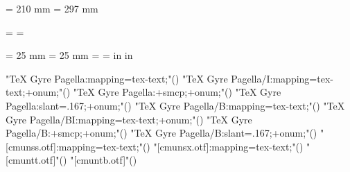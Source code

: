

\xeCJK@numtrue
\relax
\relax
{}
\makeatletter
\newdimen\paperwidth
\newdimen\paperheight
\paperwidth  = 210 mm
\paperheight = 297 mm

\begingroup
\edef\tempa{\meaning\pdfpagewidth}
\edef\tempb{\string\pdfpagewidth}
\ifx\tempa\tempb
  \endgroup
  \pdfpagewidth  = \paperwidth
  \pdfpageheight = \paperheight
\else
  \endgroup
\fi

\hoffset = 25 mm
\voffset = 25 mm
\hsize = \paperwidth
\vsize = \paperheight
\advance {}\hoffset
\advance {}\voffset
\advance {} in
\advance {} in

\def\getzihaosize#1{%
  \ifnum#11>0 %
    \ifcase#1 %
        42.16 pt%
    \or 26.10 pt%
    \or 22.08 pt%
    \or 16.06 pt%
    \or 14.05 pt%
    \or 10.54 pt%
    \or  7.53 pt%
    \or  5.52 pt%
    \or  5.02 pt%
    \fi
  \else
    \ifcase-#1 %
        36.14 pt%
    \or 24.09 pt%
    \or 18.07 pt%
    \or 15.06 pt%
    \or 12.05 pt%
    \or  9.03 pt%
    \or  6.52 pt%
    \fi
  \fi
}

  {"TeX Gyre Pagella:mapping=tex-text;"()}
 {"TeX Gyre Pagella/I:mapping=tex-text;+onum;"()}
 {"TeX Gyre Pagella:+smcp;+onum;"()}
 {"TeX Gyre Pagella:slant=.167;+onum;"()}
  {"TeX Gyre Pagella/B:mapping=tex-text;"()}
 {"TeX Gyre Pagella/BI:mapping=tex-text;+onum;"()}
 {"TeX Gyre Pagella/B:+smcp;+onum;"()}
 {"TeX Gyre Pagella/B:slant=.167;+onum;"()}
 {"[cmunss.otf]:mapping=tex-text;"()}
 {"[cmunsx.otf]:mapping=tex-text;"()}
 {"[cmuntt.otf]"()}
 {"[cmuntb.otf]"()}

